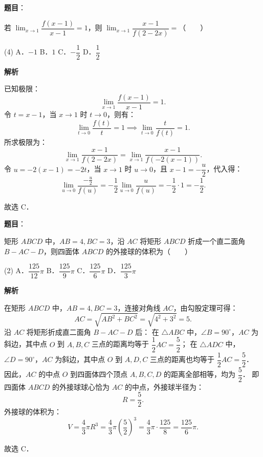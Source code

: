 \begin{answer}

\textbf{题目}：

若 $\lim_{x \to 1} \dfrac{f(x-1)}{x-1} = 1$，则 $\lim_{x \to 1} \dfrac{x-1}{f(2-2x)} =$\mbox{（　　）}

\begin{gkopts}(4)
\task A．$-1$
\task B．$1$
\task C．$-\dfrac{1}{2}$
\task D．$\dfrac{1}{2}$
\end{gkopts}

\textbf{解析}

已知极限：
\nopagebreak[4]
\[
\lim_{x \to 1} \dfrac{f(x - 1)}{x - 1} = 1.
\]
令 $t = x - 1$，当 $x \to 1$ 时 $t \to 0$，则有：
\nopagebreak[4]
\[
\lim_{t \to 0} \dfrac{f(t)}{t} = 1 \implies \lim_{t \to 0} \dfrac{t}{f(t)} = 1.
\]
所求极限为：
\nopagebreak[4]
\[
\lim_{x \to 1} \dfrac{x - 1}{f(2 - 2x)} = \lim_{x \to 1} \dfrac{x - 1}{f(-2(x - 1))}.
\]
令 $u = -2(x - 1) = -2t$，当 $x \to 1$ 时 $u \to 0$，且 $x - 1 = -\dfrac{u}{2}$，代入得：
\nopagebreak[4]
\[
\lim_{u \to 0} \dfrac{-\frac{u}{2}}{f(u)} = -\dfrac{1}{2} \lim_{u \to 0} \dfrac{u}{f(u)} = -\dfrac{1}{2} \cdot 1 = -\dfrac{1}{2}.
\]

故选 C．


\end{answer}
\begin{answer}

\textbf{题目}：

矩形 $ABCD$ 中，$AB = 4, BC = 3$，沿 $AC$ 将矩形 $ABCD$ 折成一个直二面角 $B - AC - D$，则四面体 $ABCD$ 的外接球的体积为\mbox{（　　）}

\begin{gkopts}(2)
\task A．$\dfrac{125}{12}\pi$
\task B．$\dfrac{125}{9}\pi$
\task C．$\dfrac{125}{6}\pi$
\task D．$\dfrac{125}{3}\pi$
\end{gkopts}

\textbf{解析}

在矩形 $ABCD$ 中，$AB = 4, BC = 3$，连接对角线 $AC$，由勾股定理可得：
\nopagebreak[4]
\[
AC = \sqrt{AB^2 + BC^2} = \sqrt{4^2 + 3^2} = 5.
\]
沿 $AC$ 将矩形折成直二面角 $B - AC - D$ 后：
在 $\triangle ABC$ 中，$\angle B = 90^\circ$，$AC$ 为斜边，其中点 $O$ 到 $A, B, C$ 三点的距离均等于 $\dfrac{1}{2}AC = \dfrac{5}{2}$；
在 $\triangle ADC$ 中，$\angle D = 90^\circ$，$AC$ 为斜边，其中点 $O$ 到 $A, D, C$ 三点的距离也均等于 $\dfrac{1}{2}AC = \dfrac{5}{2}$．
因此，$AC$ 的中点 $O$ 到四面体四个顶点 $A, B, C, D$ 的距离全部相等，均为 $\dfrac{5}{2}$．
即四面体 $ABCD$ 的外接球球心恰为 $AC$ 的中点，外接球半径为：
\nopagebreak[4]
\[
R = \dfrac{5}{2}.
\]
外接球的体积为：
\nopagebreak[4]
\[
V = \dfrac{4}{3}\pi R^3 = \dfrac{4}{3}\pi \left(\dfrac{5}{2}\right)^3 = \dfrac{4}{3}\pi \cdot \dfrac{125}{8} = \dfrac{125}{6}\pi.
\]

故选 C．


\end{answer}
